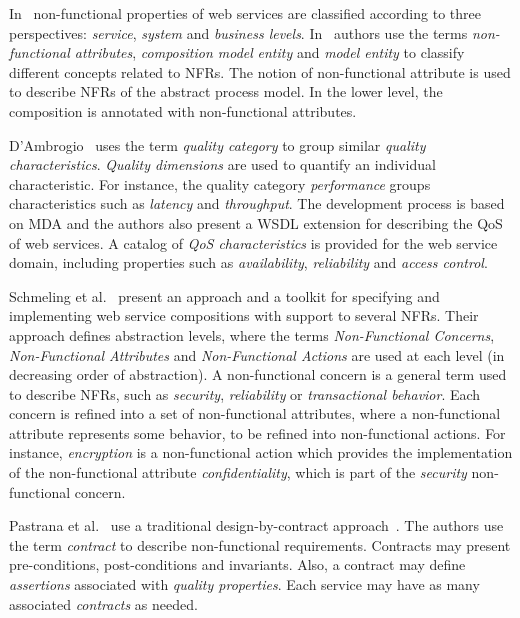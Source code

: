 \documentclass{singlecol-new}
\theoremstyle{TH}{
\newtheorem{lemma}{Lemma}
\newtheorem{theorem}[lemma]{Theorem}
\newtheorem{corrolary}[lemma]{Corrolary}
\newtheorem{conjecture}[lemma]{Conjecture}
\newtheorem{proposition}[lemma]{Proposition}
\newtheorem{claim}[lemma]{Claim}
\newtheorem{stheorem}[lemma]{Wrong Theorem}
\newtheorem{algorithm}{Algorithm}
}
\theoremstyle{THrm}{
\newtheorem{definition}{Definition}[section]
\newtheorem{question}{Question}[section]
\newtheorem{remark}{Remark}
\newtheorem{scheme}{Scheme}
}
\theoremstyle{THhit}{
\newtheorem{case}{Case}[section]
}
\theoremstyle{THhsl}{
\newtheorem{example}{Example}
}
\begin{document}
In~\cite{Babamir2010,Yeom2006} non-functional properties of web services are classified according to three perspectives:
\textit{service}, \textit{system} and \textit{business levels}.
In~\cite{XiaoCZBOLH08}  authors use the terms
\textit{non-functional attributes}, \textit{composition mo\-del}  \textit{entity} and \textit{mo\-del entity}  to classify different concepts related to NFRs.
The notion of non-functional attribute is used to describe NFRs of the abstract process model.
In the lower level, the composition is annotated with non-functional attributes.

D'Ambrogio~\cite{DAmbrogio06} uses the term \textit{quality category} to group similar \textit{quality characteristics}.
\textit{Quality dimensions} are used to quantify an individual characteristic.
For instance, the quality category \textit{performance} groups characteristics such as
\textit{latency} and \textit{throughput}.
The development process is based on MDA and the authors also present a WSDL extension for describing the QoS of web services. A catalog of \textit{QoS characteristics} is provided for the web service domain, including properties such as \textit{availability}, \textit{reliability} and \textit{access control}.


Schmeling et al.~\cite{SchmelingCM11} present an approach and a toolkit for specifying and implementing web service compositions with support to several NFRs.
Their approach defines abstraction levels, where the terms \textit{Non-Functional Concerns}, \textit{Non-Functional Attributes} and \textit{Non-Functional Actions} are used at each level (in decreasing order of abstraction).
A non-func\-tion\-al concern is a general term used to describe NFRs, such as  \textit{security}, \textit{reliability} or \textit{transactional behavior}.
Each  concern is refined into a set of non-func\-tion\-al  at\-tri\-butes, where
a non-func\-tion\-al at\-tri\-bute represents some behavior, to be refined into non-functional actions.
For instance, \textit{encryption} is a non-func\-tion\-al  action  which provides the implementation of the non-functional attribute \textit{confidentiality}, which is part of the \textit{security} non-functional concern.

Pastrana et al.~\cite{PastranaPK11} use a traditional design-by-contract approach~\cite{Meyer97}.
The authors use the term \textit{contract} to describe non-functional re\-quire\-ments.
Contracts may present pre-con\-di\-tions, post-conditions and invariants.
Also, a con\-tract may define \textit{assertions} associated with \textit{qual\-i\-ty properties}.
Each service may have as many associated \textit{contracts} as needed.
\end{document}
